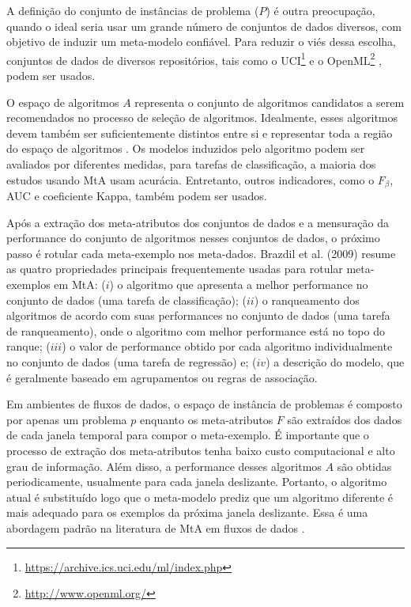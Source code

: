 A definição do conjunto de instâncias de problema ($P$) é outra preocupação, quando o ideal seria usar um grande número de conjuntos de dados diversos, com objetivo de induzir um meta-modelo confiável.
Para reduzir o viés dessa escolha, conjuntos de dados de diversos repositórios, tais como o UCI\footnote{\url{https://archive.ics.uci.edu/ml/index.php}} \cite{Lichman2013} e o OpenML\footnote{\url{http://www.openml.org/}} \cite{OpenML2013}, podem ser usados.

O espaço de algoritmos $A$ representa o conjunto de algoritmos candidatos a serem recomendados no processo de seleção de algoritmos.
Idealmente, esses algoritmos devem também ser suficientemente distintos entre si e representar toda a região do espaço de algoritmos \cite{Munoz2018}. 
Os modelos induzidos pelo algoritmo podem ser avaliados por diferentes medidas, para tarefas de classificação, a maioria dos estudos usando MtA usam acurácia. Entretanto, outros indicadores, como o $F_\beta$, AUC e coeficiente Kappa, também podem ser usados.

Após a extração dos meta-atributos dos conjuntos de dados e a mensuração da performance do conjunto de algoritmos nesses conjuntos de dados, o próximo passo é rotular cada meta-exemplo nos meta-dados. 
Brazdil et al. (2009) \cite{Brazdil2009} resume as quatro propriedades principais frequentemente usadas para rotular meta-exemplos em MtA: ($i$)
o algoritmo que apresenta a melhor performance no conjunto de dados (uma tarefa de classificação); ($ii$) o ranqueamento dos algoritmos de acordo com suas performances no conjunto de dados (uma tarefa de ranqueamento), onde o algoritmo com melhor performance está no topo do ranque; ($iii$) o valor de performance obtido por cada algoritmo individualmente no conjunto de dados (uma tarefa de regressão) e; ($iv$) a descrição do modelo, que é geralmente baseado em agrupamentos ou regras de associação.

Em ambientes de fluxos de dados, o espaço de instância de problemas é composto por apenas um problema $p$ enquanto os meta-atributos $F$ são extraídos dos dados de cada janela temporal para compor o meta-exemplo.
É importante que o processo de extração dos meta-atributos tenha baixo custo computacional e alto grau de informação.
Além disso, a  performance desses algoritmos $A$ são obtidas periodicamente, usualmente para cada janela deslizante. 
Portanto, o algoritmo atual é substituído logo que o meta-modelo prediz que um algoritmo diferente é mais adequado para os exemplos da próxima janela deslizante.
Essa é uma abordagem padrão na literatura de MtA em fluxos de dados \cite{read2012batch, vanrijn2014algorithm, Anderson2019}.

